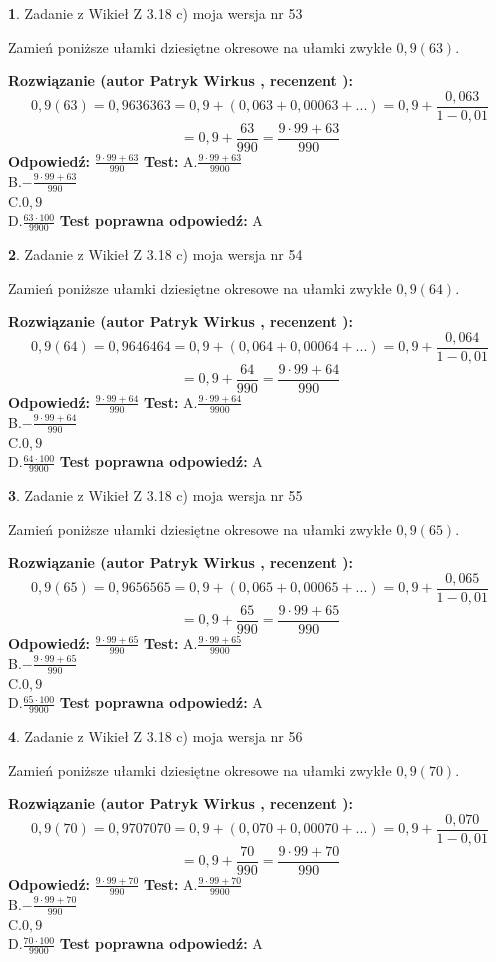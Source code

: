 \documentclass[12pt, a4paper]{article}
\theoremstyle{definition} %
\newtheorem{zad}{}
\newcommand{\zadStart}[1]{\begin{zad}#1\newline}
\newcommand{\zadStop}{\end{zad}}
\newcommand{\rozwStart}[2]{\noindent \textbf{Rozwiązanie (autor #1 , recenzent #2): }\newline}
\newcommand{\rozwStop}{\newline}
\newcommand{\odpStart}{\noindent \textbf{Odpowiedź:}\newline}
\newcommand{\odpStop}{\newline}
\newcommand{\testStart}{\noindent \textbf{Test:}\newline}
\newcommand{\testStop}{\newline}
\newcommand{\kluczStart}{\noindent \textbf{Test poprawna odpowiedź:}\newline}
\newcommand{\kluczStop}{\newline}
\begin{document}
\zadStart{Zadanie z Wikieł Z 3.18 c) moja wersja nr 53}

Zamień poniższe ułamki dziesiętne okresowe na ułamki zwykłe $0,9(63)$.
\zadStop
\rozwStart{Patryk Wirkus}{}
$$0,9(63)=0,9636363=0,9+(0,063+0,00063+...)=0,9+\frac{0,063}{1-0,01}$$
$$=0,9+\frac{63}{990}=\frac{9\cdot99+63}{990}$$
\rozwStop
\odpStart
$\frac{9\cdot99+63}{990}$
\odpStop
\testStart
A.$\frac{9\cdot99+63}{9900}$\\ B.$-\frac{9\cdot99+63}{990}$\\ C.$0,9$\\ D.$\frac{63\cdot100}{9900}$
\testStop
\kluczStart
A
\kluczStop



\zadStart{Zadanie z Wikieł Z 3.18 c) moja wersja nr 54}

Zamień poniższe ułamki dziesiętne okresowe na ułamki zwykłe $0,9(64)$.
\zadStop
\rozwStart{Patryk Wirkus}{}
$$0,9(64)=0,9646464=0,9+(0,064+0,00064+...)=0,9+\frac{0,064}{1-0,01}$$
$$=0,9+\frac{64}{990}=\frac{9\cdot99+64}{990}$$
\rozwStop
\odpStart
$\frac{9\cdot99+64}{990}$
\odpStop
\testStart
A.$\frac{9\cdot99+64}{9900}$\\ B.$-\frac{9\cdot99+64}{990}$\\ C.$0,9$\\ D.$\frac{64\cdot100}{9900}$
\testStop
\kluczStart
A
\kluczStop



\zadStart{Zadanie z Wikieł Z 3.18 c) moja wersja nr 55}

Zamień poniższe ułamki dziesiętne okresowe na ułamki zwykłe $0,9(65)$.
\zadStop
\rozwStart{Patryk Wirkus}{}
$$0,9(65)=0,9656565=0,9+(0,065+0,00065+...)=0,9+\frac{0,065}{1-0,01}$$
$$=0,9+\frac{65}{990}=\frac{9\cdot99+65}{990}$$
\rozwStop
\odpStart
$\frac{9\cdot99+65}{990}$
\odpStop
\testStart
A.$\frac{9\cdot99+65}{9900}$\\ B.$-\frac{9\cdot99+65}{990}$\\ C.$0,9$\\ D.$\frac{65\cdot100}{9900}$
\testStop
\kluczStart
A
\kluczStop



\zadStart{Zadanie z Wikieł Z 3.18 c) moja wersja nr 56}

Zamień poniższe ułamki dziesiętne okresowe na ułamki zwykłe $0,9(70)$.
\zadStop
\rozwStart{Patryk Wirkus}{}
$$0,9(70)=0,9707070=0,9+(0,070+0,00070+...)=0,9+\frac{0,070}{1-0,01}$$
$$=0,9+\frac{70}{990}=\frac{9\cdot99+70}{990}$$
\rozwStop
\odpStart
$\frac{9\cdot99+70}{990}$
\odpStop
\testStart
A.$\frac{9\cdot99+70}{9900}$\\ B.$-\frac{9\cdot99+70}{990}$\\ C.$0,9$\\ D.$\frac{70\cdot100}{9900}$
\testStop
\kluczStart
A
\kluczStop
\end{document}
